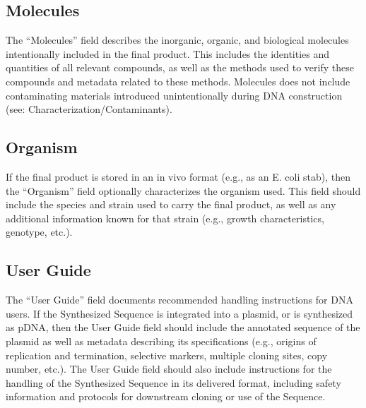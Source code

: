 \documentclass[12pt,letterpaper,english]{article}
\begin{document}
\subsection{Molecules}
The “Molecules” field describes the inorganic, organic, and biological molecules intentionally included in the final product. This includes the identities and quantities of all relevant compounds, as well as the methods used to verify these compounds and metadata related to these methods. Molecules does not include contaminating materials introduced unintentionally during DNA construction (see: Characterization/Contaminants).

\subsection{Organism}
If the final product is stored in an in vivo format (e.g., as an E. coli stab), then the “Organism” field optionally characterizes the organism used. This field should include the species and strain used to carry the final product, as well as any additional information known for that strain (e.g., growth characteristics, genotype, etc.). \par

\subsection{User Guide}
The “User Guide” field documents recommended handling instructions for DNA users. If the Synthesized Sequence is integrated into a plasmid, or is synthesized as pDNA, then the User Guide field should include the annotated sequence of the plasmid as well as metadata describing its specifications (e.g., origins of replication and termination, selective markers, multiple cloning sites, copy number, etc.). The User Guide field should also include instructions for the handling of the Synthesized Sequence in its delivered format, including safety information and protocols for downstream cloning or use of the Sequence. \par



\end{document}
